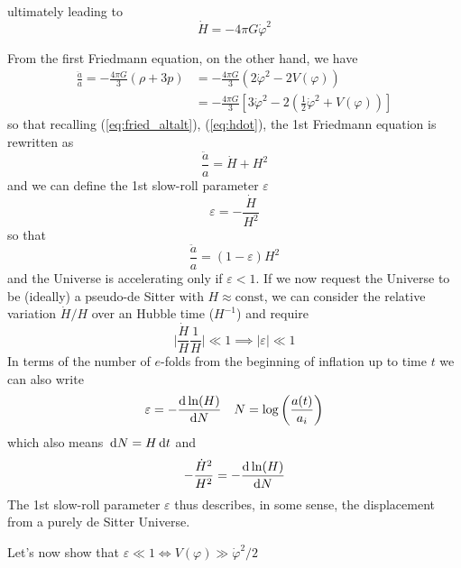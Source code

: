 ultimately leading to 
\begin{equation}
    \boxed{
        \dot{H} = -4\pi G \dot{\varphi}^{2}
    }
    \label{eq:hdot}
\end{equation}
\par From the first Friedmann equation, on the other hand, we have 
\begin{align*}
    \frac{\ddot{a}}{a} = -\frac{4\pi G}{3}(\rho + 3p) &= -\frac{4\pi G}{3}(2\dot{\varphi}^{2}-2V(\varphi)) \\
    &= -\frac{4\pi G}{3}\left[3\dot{\varphi}^{2} -2\left(\frac{1}{2}\dot{\varphi}^{2}+V(\varphi)\right)\right]
\end{align*}
so that recalling (\ref{eq:fried_altalt}), (\ref{eq:hdot}), the 1st Friedmann equation is rewritten as
\begin{equation}
    \frac{\ddot{a}}{a} = \dot{H} + H^{2}
\end{equation}
and we can define the 1st slow-roll parameter $\varepsilon$
\begin{equation}
    \boxed{
        \varepsilon = -\frac{\dot{H}}{H^{2}}
    }
    \label{eq:slowroll1}
\end{equation}
so that 
\begin{equation}
    \frac{\ddot{a}}{a} = (1-\varepsilon)H^{2}
\end{equation}
and the Universe is accelerating only if $\varepsilon < 1$. If we now request the Universe to be (ideally) a pseudo-de Sitter with $H\approx \text{const}$, we can consider the relative variation $\dot{H}/H$ over an Hubble time ($H^{-1}$) and require 
\begin{equation}
    \Big|\frac{\dot{H}}{H}\frac{1}{H}\Big| \ll 1 \implies |\varepsilon|\ll 1
\end{equation}
In terms of the number of $e$-folds from the beginning of inflation up to time $t$ we can also write
\begin{equation}
    \varepsilon = -\frac{\text{d}\ln (H)}{\text{d}N} \quad N = \log\left(\frac{a(t)}{a_{i}}\right)
\end{equation}
which also means $\,\text{d}N = H\,\text{d}t$ and 
\begin{equation}
    -\frac{\dot{H}^{2}}{H^{2}} = -\frac{\text{d}\ln(H)}{\text{d}N}
\end{equation}
The 1st slow-roll parameter $\varepsilon$ thus describes, in some sense, the displacement from a purely de Sitter Universe.
\par Let's now show that $\varepsilon \ll 1 \iff V(\varphi) \gg \dot{\varphi}^{2}/2$
